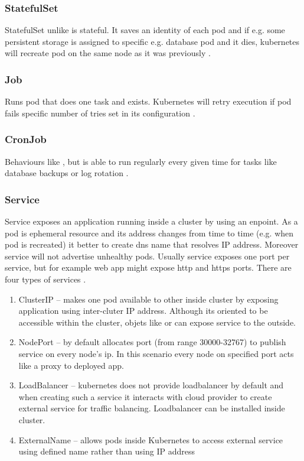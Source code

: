 \subsubsection{StatefulSet}
\label{statefulset}

StatefulSet unlike \textit{} is stateful. It saves an identity of each pod and if e.g. some persistent storage is assigned to specific e.g. database pod and it dies, kubernetes will recreate pod on the same node as it was previously \cite{KubernetesStatefulSet}.

\subsubsection{Job}
\label{job}

Runs pod that does one task and exists. Kubernetes will retry execution if pod fails specific number of tries set in its configuration \cite{KubernetesJobs}.

\subsubsection{CronJob}
\label{cronjob}
Behaviours like \textit{}, but is able to run regularly every given time for tasks like database backups or log rotation \cite{KubernetesCronJob}.

\subsubsection{Service}
\label{svc}

Service exposes an application running inside a cluster by using an enpoint. As a pod is ephemeral resource and its address changes from time to time (e.g. when pod is recreated) it better to create dns name that resolves IP address. Moreover service will not advertise unhealthy pods. Usually service exposes one port per service, but for example web app might expose http and https ports. There are four types of services \cite{KubernetesService}.

\begin{enumerate}
    \item ClusterIP -- makes one pod available to other inside cluster by exposing application using inter-cluter IP address. Although its oriented to be accessible within the cluster, objets like \textit{} or \textit{} can expose service to the outside.
    \item NodePort -- by default allocates port (from range 30000-32767) to publish service on every node's ip. In this scenario every node on specified port acts like a proxy to deployed app.
    \item LoadBalancer -- kubernetes does not provide loadbalancer by default and when creating such a service it interacts with cloud provider to create external service for traffic balancing. Loadbalancer can be installed inside cluster.
    \item ExternalName -- allows pods inside Kubernetes to access external service using defined name rather than using IP address 
\end{enumerate}

